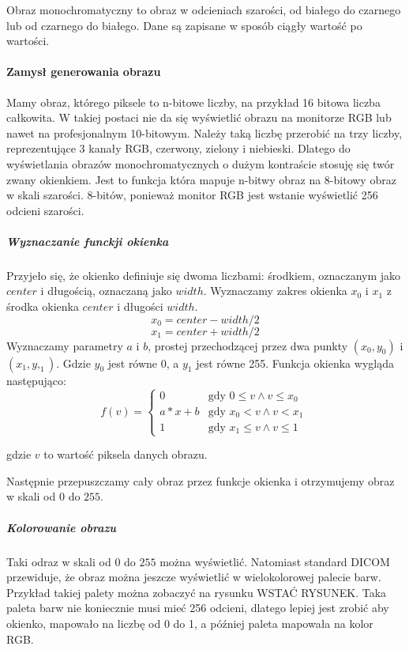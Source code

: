 
Obraz monochromatyczny to obraz w odcieniach szarości, od białego do czarnego lub od czarnego do białego. Dane są zapisane w sposób ciągły wartość po wartości.

\paragraph{Zamysł generowania obrazu}

Mamy obraz, którego piksele to n-bitowe liczby, na przykład 16 bitowa liczba całkowita.
W takiej postaci nie da się wyświetlić obrazu na monitorze RGB lub nawet na profesjonalnym 10-bitowym.
Należy taką liczbę przerobić na trzy liczby, reprezentujące 3 kanały RGB, czerwony, zielony i niebieski.
Dlatego do wyświetlania obrazów monochromatycznych o dużym kontraście stosuję się twór zwany okienkiem.
Jest to funkcja która mapuje n-bitwy obraz na 8-bitowy obraz w skali szarości.
8-bitów, ponieważ monitor RGB jest wstanie wyświetlić 256 odcieni szarości.

\subparagraph{Wyznaczanie funckji okienka}
Przyjeło się, że okienko definiuje się dwoma liczbami: środkiem, oznaczanym jako $center$ i długością, oznaczaną jako $width$.
Wyznaczamy zakres okienka $x_0$ i $x_1$ z środka okienka $center$ i długości $width$.
\[x_0 = center - width / 2\]
\[x_1 = center + width / 2\]
Wyznaczamy parametry $a$ i $b$, prostej przechodzącej przez dwa punkty $(x_0, y_0)$ i $(x_1, y,_1)$.
Gdzie $y_0$ jest równe 0, a $y_1$ jest równe 255.
Funkcja okienka wygląda następująco:
\[
    f(v)=
    \begin{cases}
    0     & \text{gdy $0 \le v \wedge v \le x_0$ }\\
    a*x+b & \text{gdy $x_0 < v \wedge v < x_1$}\\
    1     & \text{gdy $x_1 \le v \wedge v \le 1$ } 
    \end{cases}
\]

gdzie $v$ to wartość piksela danych obrazu.

Następnie przepuszczamy cały obraz przez funkcje okienka i otrzymujemy obraz w skali od $0$ do $255$.

\subparagraph{Kolorowanie obrazu}

Taki odraz w skali od $0$ do $255$ można wyświetlić.
Natomiast standard DICOM przewiduje, że obraz można jeszcze wyświetlić w wielokolorowej palecie barw.
Przykład takiej palety można zobaczyć na rysunku WSTAĆ RYSUNEK.
Taka paleta barw nie koniecznie musi mieć 256 odcieni, dlatego lepiej jest zrobić aby okienko, mapowało na liczbę od 0 do 1, a później paleta mapowała na kolor RGB.


